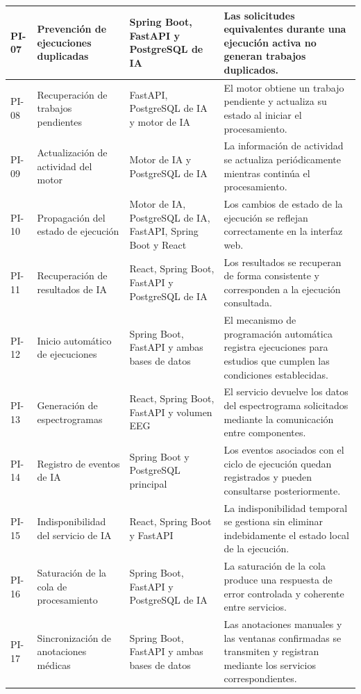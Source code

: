 \begin{longtable}{|
>{\raggedright\arraybackslash}p{1.1cm}|
>{\raggedright\arraybackslash}p{3.5cm}|
>{\raggedright\arraybackslash}p{3.5cm}|
>{\raggedright\arraybackslash}p{5.0cm}|}
PI-07 &
Prevención de ejecuciones duplicadas &
Spring Boot, FastAPI y PostgreSQL de IA &
Las solicitudes equivalentes durante una ejecución activa no generan trabajos duplicados. \\
\hline

PI-08 &
Recuperación de trabajos pendientes &
FastAPI, PostgreSQL de IA y motor de IA &
El motor obtiene un trabajo pendiente y actualiza su estado al iniciar el procesamiento. \\
\hline

PI-09 &
Actualización de actividad del motor &
Motor de IA y PostgreSQL de IA &
La información de actividad se actualiza periódicamente mientras continúa el procesamiento. \\
\hline

PI-10 &
Propagación del estado de ejecución &
Motor de IA, PostgreSQL de IA, FastAPI, Spring Boot y React &
Los cambios de estado de la ejecución se reflejan correctamente en la interfaz web. \\
\hline

PI-11 &
Recuperación de resultados de IA &
React, Spring Boot, FastAPI y PostgreSQL de IA &
Los resultados se recuperan de forma consistente y corresponden a la ejecución consultada. \\
\hline

PI-12 &
Inicio automático de ejecuciones &
Spring Boot, FastAPI y ambas bases de datos &
El mecanismo de programación automática registra ejecuciones para estudios que cumplen las condiciones establecidas. \\
\hline

PI-13 &
Generación de espectrogramas &
React, Spring Boot, FastAPI y volumen EEG &
El servicio devuelve los datos del espectrograma solicitados mediante la comunicación entre componentes. \\
\hline

PI-14 &
Registro de eventos de IA &
Spring Boot y PostgreSQL principal &
Los eventos asociados con el ciclo de ejecución quedan registrados y pueden consultarse posteriormente. \\
\hline

PI-15 &
Indisponibilidad del servicio de IA &
React, Spring Boot y FastAPI &
La indisponibilidad temporal se gestiona sin eliminar indebidamente el estado local de la ejecución. \\
\hline

PI-16 &
Saturación de la cola de procesamiento &
Spring Boot, FastAPI y PostgreSQL de IA &
La saturación de la cola produce una respuesta de error controlada y coherente entre servicios. \\
\hline

PI-17 &
Sincronización de anotaciones médicas &
Spring Boot, FastAPI y ambas bases de datos &
Las anotaciones manuales y las ventanas confirmadas se transmiten y registran mediante los servicios correspondientes. \\
\hline

\end{longtable}


